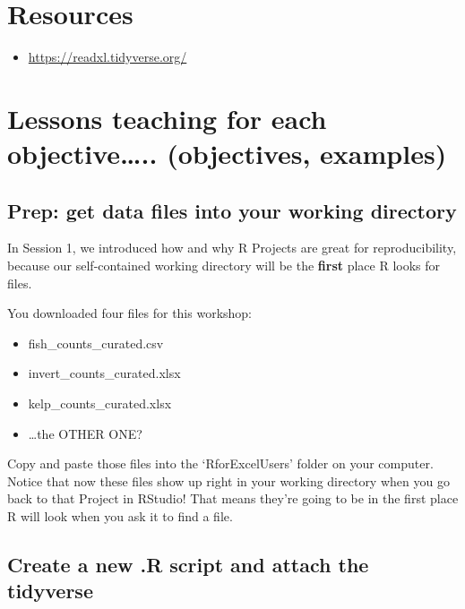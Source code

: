 \documentclass[]{book}
\providecommand{\tightlist}{%
  \setlength{\itemsep}{0pt}\setlength{\parskip}{0pt}}
\begin{document}
\hypertarget{resources-1}{%
\section{Resources}\label{resources-1}}

\begin{itemize}
\tightlist
\item
  \url{https://readxl.tidyverse.org/}
\end{itemize}

\hypertarget{lessons-teaching-for-each-objective..-objectives-examples}{%
\section{Lessons teaching for each objective\ldots{}.. (objectives, examples)}\label{lessons-teaching-for-each-objective..-objectives-examples}}

\hypertarget{prep-get-data-files-into-your-working-directory}{%
\subsection{Prep: get data files into your working directory}\label{prep-get-data-files-into-your-working-directory}}

In Session 1, we introduced how and why R Projects are great for reproducibility, because our self-contained working directory will be the \textbf{first} place R looks for files.

You downloaded four files for this workshop:

\begin{itemize}
\tightlist
\item
  fish\_counts\_curated.csv
\item
  invert\_counts\_curated.xlsx
\item
  kelp\_counts\_curated.xlsx
\item
  \ldots{}the OTHER ONE?
\end{itemize}

Copy and paste those files into the `RforExcelUsers' folder on your computer. Notice that now these files show up right in your working directory when you go back to that Project in RStudio! That means they're going to be in the first place R will look when you ask it to find a file.

\hypertarget{create-a-new-.r-script-and-attach-the-tidyverse}{%
\subsection{Create a new .R script and attach the tidyverse}\label{create-a-new-.r-script-and-attach-the-tidyverse}}
\end{document}
